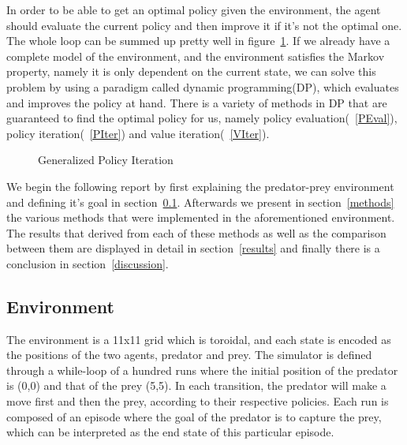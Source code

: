 \documentclass[paper=a4, fontsize=11pt]{scrartcl}
\numberwithin{equation}{section}		%
\numberwithin{figure}{section}			%
\numberwithin{table}{section}				%
\begin{document}
In order to be able to get an optimal policy given the environment, the agent should evaluate the current policy and then improve it if it's not the optimal one. The whole loop can be summed up pretty well in figure~\ref{GPI}. If we already have a complete model of the environment, and the environment satisfies the Markov property, namely it is only dependent on the current state, we can solve this problem by using a paradigm called dynamic programming(DP), which evaluates and improves the policy at hand. There is a variety of methods in DP that are guaranteed to find the optimal policy for us, namely policy evaluation(~\ref{PEval}), policy iteration(~\ref{PIter}) and value iteration(~\ref{VIter}).    
\begin{figure}[H] \centering
{}
\caption{Generalized Policy Iteration} 
\label{GPI}
\end{figure}

We begin the following report by first explaining the predator-prey environment and defining it's goal in section~\ref{environment}. Afterwards we present in section~\ref{methods} the various methods that were implemented in the aforementioned environment. The results that derived from each of these methods as well as the comparison between them are displayed in detail in section~\ref{results} and finally there is a conclusion in section~\ref{discussion}.

\subsection{Environment}
\label{environment}
The environment is a 11x11 grid which is toroidal, and each state is encoded as the positions of the two agents, predator and prey.
The simulator is defined through a while-loop of a hundred runs where the initial position of the predator is (0,0) and that of the prey (5,5). In each transition, the predator will make a move first and then the prey, according to their respective policies. Each run is composed of an episode where the goal of the predator is to capture the prey, which can be interpreted as the end state of this particular episode. 
\end{document}
